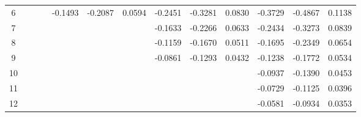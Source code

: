 \documentclass[12pt,a4paper]{article}
\numberwithin{equation}{section}
\begin{document}
\begin{table}
\begin{tabular}{c ccc ccc ccc ccc}
6
&         &         &
& -0.1493 & -0.2087 & 0.0594
& -0.2451 & -0.3281 & 0.0830
& -0.3729 & -0.4867 & 0.1138
\\

7
&         &         &
&         &         &
& -0.1633 & -0.2266 & 0.0633
& -0.2434 & -0.3273 & 0.0839
\\

8
&         &         &
&         &         &
& -0.1159 & -0.1670 & 0.0511
& -0.1695 & -0.2349 & 0.0654
\\

9
&         &         &
&         &         &
& -0.0861 & -0.1293 & 0.0432
& -0.1238 & -0.1772 & 0.0534
\\

10
&         &         &
&         &         &
&         &         &
& -0.0937 & -0.1390 & 0.0453
\\

11
&         &         &
&         &         &
&         &         &
& -0.0729 & -0.1125 & 0.0396
\\

12
&         &         &
&         &         &
&         &         &
& -0.0581 & -0.0934 & 0.0353
\\

\bottomrule
\end{tabular}
\end{table}
\end{document}

